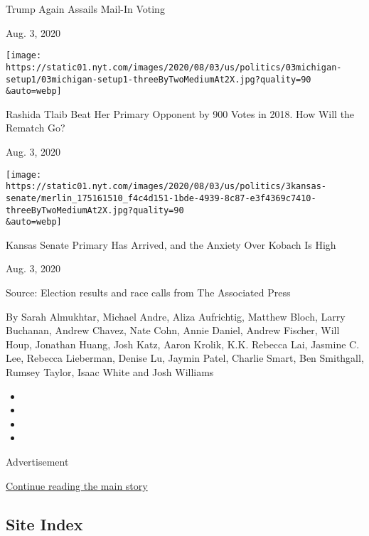 Trump Again Assails Mail-In Voting

Aug. 3, 2020

\href{https://www.nytimes.com/2020/08/03/us/politics/michigan-primary-rashida-tlaib-brenda-jones.html?action=click\&module=ELEX_results\&pgtype=Interactive\&region=RelatedCoverage}{}

\texttt{[image: https://static01.nyt.com/images/2020/08/03/us/politics/03michigan-setup1/03michigan-setup1-threeByTwoMediumAt2X.jpg?quality=90\\\&auto=webp]}

Rashida Tlaib Beat Her Primary Opponent by 900 Votes in 2018. How Will
the Rematch Go?

Aug. 3, 2020

\href{https://www.nytimes.com/2020/08/03/us/politics/kris-kobach-kansas-senate-primary.html?action=click\&module=ELEX_results\&pgtype=Interactive\&region=RelatedCoverage}{}

\texttt{[image: https://static01.nyt.com/images/2020/08/03/us/politics/3kansas-senate/merlin\_175161510\_f4c4d151-1bde-4939-8c87-e3f4369c7410-threeByTwoMediumAt2X.jpg?quality=90\\\&auto=webp]}

Kansas Senate Primary Has Arrived, and the Anxiety Over Kobach Is High

Aug. 3, 2020

Source: Election results and race calls from The Associated Press

By Sarah Almukhtar, Michael Andre, Aliza Aufrichtig, Matthew Bloch,
Larry Buchanan, Andrew Chavez, Nate Cohn, Annie Daniel, Andrew Fischer,
Will Houp, Jonathan Huang, Josh Katz, Aaron Krolik, K.K. Rebecca Lai,
Jasmine C. Lee, Rebecca Lieberman, Denise Lu, Jaymin Patel, Charlie
Smart, Ben Smithgall, Rumsey Taylor, Isaac White and Josh Williams

\begin{itemize}
\item
\item
\item
\item
\end{itemize}

Advertisement

\protect\hyperlink{after-bottom}{Continue reading the main story}

\hypertarget{site-index}{%
\subsection{Site Index}\label{site-index}}

